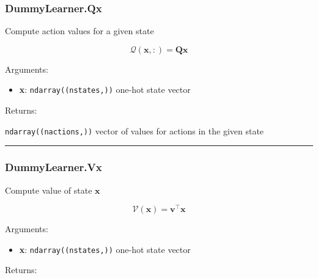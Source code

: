 \subsubsection{DummyLearner.Qx}\label{dummylearner.qx}

\begin{Shaded}
\begin{Highlighting}[]
\end{Highlighting}
\end{Shaded}

Compute action values for a given state

\[
\mathcal Q(\mathbf x, :) = \mathbf Q \mathbf x
\]

Arguments:

\begin{itemize}
\tightlist
\item
  \textbf{x}: \texttt{ndarray((nstates,))} one-hot state vector
\end{itemize}

Returns:

\texttt{ndarray((nactions,))} vector of values for actions in the given
state

\begin{center}\rule{0.5\linewidth}{\linethickness}\end{center}

\subsubsection{DummyLearner.Vx}\label{dummylearner.vx}

\begin{Shaded}
\begin{Highlighting}[]
\end{Highlighting}
\end{Shaded}

Compute value of state \(\mathbf x\)

\[
\mathcal V(\mathbf x) = \mathbf v^\top \mathbf x
\]

Arguments:

\begin{itemize}
\tightlist
\item
  \textbf{x}: \texttt{ndarray((nstates,))} one-hot state vector
\end{itemize}

Returns:


